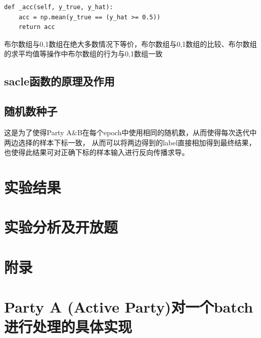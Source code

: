 \documentclass[twoside,11pt]{article}
\begin{document}
\begin{lstlisting}
def _acc(self, y_true, y_hat):
    acc = np.mean(y_true == (y_hat >= 0.5))
    return acc
\end{lstlisting}

布尔数组与0,1数组在绝大多数情况下等价，布尔数组与0,1数组的比较、布尔数组的求平均值等操作中布尔数组的行为与0,1数组一致




\subsection{sacle函数的原理及作用}



\subsection{随机数种子}

这是为了使得Party A\&B在每个epoch中使用相同的随机数，从而使得每次迭代中两边选择的样本下标一致，
从而可以将两边得到的label直接相加得到最终结果，也使得此结果可对正确下标的样本输入进行反向传播求导。


\section{实验结果}




\section{实验分析及开放题}

\appendix
\section*{附录}

\section{Party A (Active Party)对一个batch进行处理的具体实现}
\end{document}
